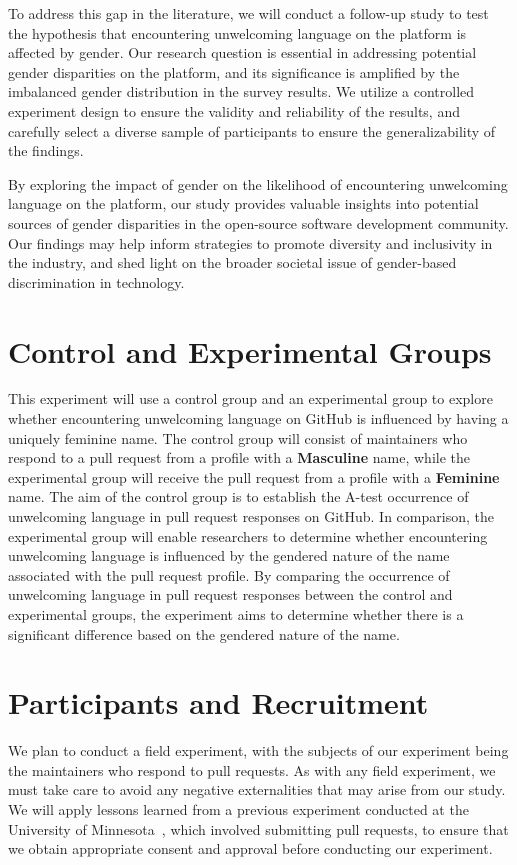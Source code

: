 \documentclass[journal,12pt,onecolumn,]{IEEEtran}
\begin{document}
To address this gap in the literature, we will conduct a follow-up study to test the hypothesis that encountering unwelcoming language on the platform is affected by gender. Our research question is essential in addressing potential gender disparities on the platform, and its significance is amplified by the imbalanced gender distribution in the survey results. We utilize a controlled experiment design to ensure the validity and reliability of the results, and carefully select a diverse sample of participants to ensure the generalizability of the findings.

By exploring the impact of gender on the likelihood of encountering unwelcoming language on the platform, our study provides valuable insights into potential sources of gender disparities in the open-source software development community. Our findings may help inform strategies to promote diversity and inclusivity in the industry, and shed light on the broader societal issue of gender-based discrimination in technology.


\section{Control and Experimental Groups}
This experiment will use a control group and an experimental group to explore whether encountering unwelcoming language on GitHub is influenced by having a uniquely feminine name.  
The control group will consist of maintainers who respond to a pull request from a profile with a \textbf{Masculine} name, while the experimental group will receive the pull request from a profile with a \textbf{Feminine} name. 
The aim of the control group is to establish the A-test occurrence of unwelcoming language in pull request responses on GitHub. 
In comparison, the experimental group will enable researchers to determine whether encountering unwelcoming language is influenced by the gendered nature of the name associated with the pull request profile. 
By comparing the occurrence of unwelcoming language in pull request responses between the control and experimental groups, the experiment aims to determine whether there is a significant difference based on the gendered nature of the name.


\section{Participants and Recruitment}

We plan to conduct a field experiment, with the subjects of our experiment being the maintainers who respond to pull requests.
As with any field experiment, we must take care to avoid any negative externalities that may arise from our study. We will apply lessons learned from a previous experiment conducted at the University of Minnesota~\cite{hypocritecommits}, which involved submitting pull requests, to ensure that we obtain appropriate consent and approval before conducting our experiment.
\end{document}
